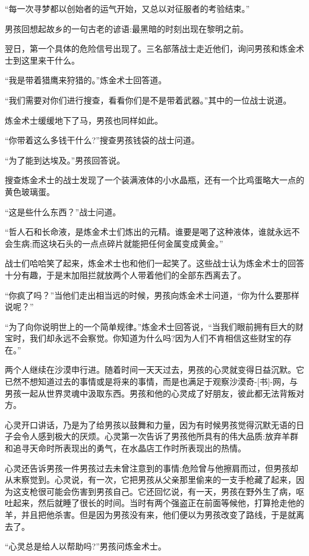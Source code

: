 \documentclass[twoside,openany]{book}
\begin{document}
“每一次寻梦都以创始者的运气开始，又总以对征服者的考验结束。”

男孩回想起故乡的一句古老的谚语:最黑暗的时刻出现在黎明之前。

翌日，第一个具体的危险信号出现了。三名部落战士走近他们，询问男孩和炼金术士到这里来干什么。

“我是带着猎鹰来狩猎的。”炼金术士回答道。

“我们需要对你们进行搜查，看看你们是不是带着武器。”其中的一位战士说道。

炼金术士缓缓地下了马，男孩也同样如此。

“你带着这么多钱干什么?”搜查男孩钱袋的战士问道。

“为了能到达埃及。”男孩回答说。

搜查炼金术士的战士发现了一个装满液体的小水晶瓶，还有一个比鸡蛋略大一点的黄色玻璃蛋。

“这是些什么东西？”战士问道。

“哲人石和长命液，是炼金术士们炼出的元精。谁要是喝了这种液体，谁就永远不会生病;而这块石头的一点点碎片就能把任何金属变成黄金。”

战士们哈哈笑了起来，炼金术士也和他们一起笑了。这些战士认为炼金术士的回答十分有趣，于是末加阻拦就放两个人带着他们的全部东西离去了。

“你疯了吗？”当他们走出相当远的时候，男孩向炼金术士问道，“你为什么要那样说呢？”

“为了向你说明世上的一个简单规律。”炼金术士回答说，“当我们眼前拥有巨大的财宝时，我们却永远不会察觉。你知道为什么吗?因为人们不肯相信这些财宝的存在。”

两个人继续在沙漠申行进。随着时间一天天过去，男孩的心灵就变得日益沉默。它已然不想知道过去的事情或是将来的事情，而是也满足于观察沙漠奇-[书]-网，与男孩一起从世界灵魂中汲取东西。男孩和他的心灵成了好朋友，彼此都无法背叛对方。

心灵开口讲话，乃是为了给男孩以鼓舞和力量，因为有时候男孩觉得沉默无语的日子会令人感到极大的厌烦。心灵第一次告诉了男孩他所具有的伟大品质:放弃羊群和追寻天命时所表现出的勇气，在水晶店工作时所表现出的热情。

心灵还告诉男孩一件男孩过去未曾注意到的事情:危险曾与他擦肩而过，但男孩却从末察觉到。心灵说，有一次，它把男孩从父亲那里偷来的一支手枪藏了起来，因为这支枪很可能会伤害到男孩自己。它还回忆说，有一天，男孩在野外生了病，呕吐起来，然后就睡了很长的时间。当时有两个强盗正在前面等候他，打算抢走他的羊，并且把他杀害。但是因为男孩没有来，他们便以为男孩改变了路线，于是就离去了。

“心灵总是给人以帮助吗?”男孩问炼金术士。
\end{document}
